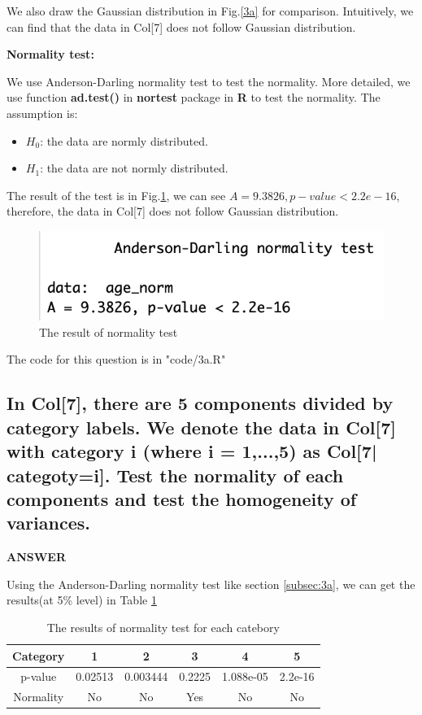 \documentclass[a4paper]{article}
\begin{document}
We also draw the Gaussian distribution in Fig.\ref{3a} for comparison. Intuitively, we can find that the data in Col[7] does not follow Gaussian distribution.

\textbf{Normality test:}

We use Anderson-Darling normality test to test the normality. More detailed, we use function \textbf{ad.test()} in \textbf{nortest} package in \textbf{R} to test the normality.  The assumption is:
\begin{itemize}
	\item $H_0$: the data are normly distributed.
	\item $H_1$: the data are not normly distributed.
\end{itemize}

The result of the test is in Fig.\ref{3a2}, we can see $A=9.3826, p-value<2.2e-16$, therefore, the data in Col[7] does not follow Gaussian distribution.
\begin{figure}[h]
	\centering
	\includegraphics[width=0.7\linewidth]{images/3a2.png}
	\caption{\label{3a2}The result of normality test}
\end{figure}

The code for this question is in "code/3a.R"

\subsection{In Col[7], there are 5 components divided by category labels. We denote the data in Col[7] with category i (where i = 1,...,5) as Col[7| categoty=i]. Test the normality of each components and test the homogeneity of variances.}

\textbf{ANSWER}

Using the Anderson-Darling normality test like section \ref{subsec:3a}, we can get the results(at 5\% level) in Table \ref{tab:table1}

\begin{table}[htbp]
	\centering
	\caption{The results of normality test for each catebory}
	\label{tab:table1}
	\begin{tabular}{|c|c|c|c|c|c|}
		\hline
		Category & 1 & 2 & 3 & 4 & 5 \\
		\hline
		p-value & 0.02513 & 0.003444 & 0.2225 & 1.088e-05 & 2.2e-16 \\
		\hline
		Normality & No & No & Yes & No & No \\
		\hline
	\end{tabular}
\end{table}
\end{document}
